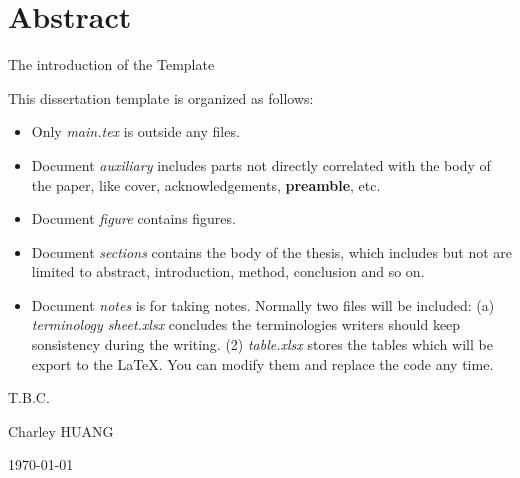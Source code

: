 \section*{Abstract}

\bigskip

The introduction of the Template

This dissertation template is organized as follows:
\begin{itemize}
  \item Only \textit{main.tex} is outside any files.
  \item Document \textit{auxiliary} includes parts not directly correlated with the body of the paper, like cover, acknowledgements, \textbf{preamble}, etc.
  \item Document \textit{figure} contains figures.
  \item Document \textit{sections} contains the body of the thesis, which includes but not are limited to abstract, introduction, method, conclusion and so on.
  \item Document \textit{notes} is for taking notes. Normally two files will be included: (a) \textit{terminology sheet.xlsx} concludes the terminologies writers should keep sonsistency during the writing. (2) \textit{table.xlsx} stores the tables which will be export to the \LaTeX. You can modify them and replace the code any time.
\end{itemize}

T.B.C.

\begin{flushright}
	Charley HUANG
	
	\today
\end{flushright}
